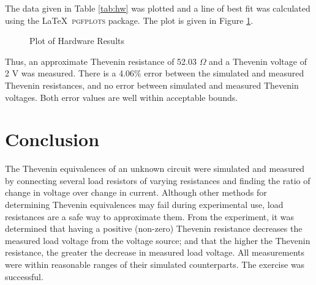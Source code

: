 \documentclass[EEEE]{KGCOEReport}
\begin{document}
The data given in Table \ref{tab:hw} was plotted and a line of best fit was
calculated using the \LaTeX \ \textsc{pgfplots} package. The plot is given in
Figure \ref{fig:hw-plot}.

\hwtbl

\begin{figure}[H]
	\center
	\caption{Plot of Hardware Results}
	\label{fig:hw-plot}
\end{figure}



Thus, an approximate Thevenin resistance of 52.03 $\Omega$ and a Thevenin
voltage of 2 V was measured. There is a 4.06\% error between the simulated and
measured Thevenin resistances, and no error between simulated and measured
Thevenin voltages. Both error values are well within acceptable bounds.

\section{Conclusion}

The Thevenin equivalences of an unknown circuit were simulated and measured
by connecting several load resistors of varying resistances and finding the
ratio of change in voltage over change in current. Although other methods for
determining Thevenin equivalences may fail during experimental use, load
resistances are a safe way to approximate them. From the experiment, it was
determined that having a positive (non-zero) Thevenin resistance decreases the
measured load voltage from the voltage source; and that the higher the
Thevenin resistance, the greater the decrease in measured load voltage. All
measurements were within reasonable ranges of their simulated counterparts. The
exercise was successful.
\end{document}
